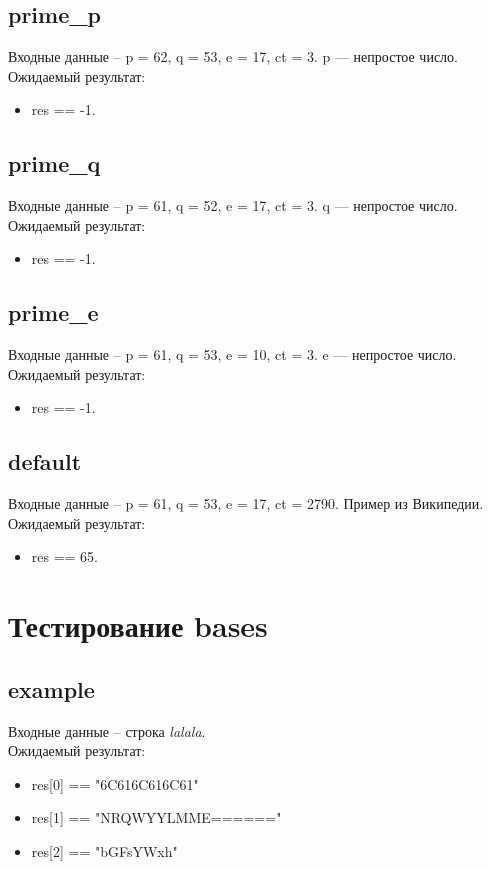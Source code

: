 \documentclass{article}
\begin{document}
\subsection{prime\_p}
Входные данные -- p = 62, q = 53, e = 17, ct = 3. p --- непростое число.\\
Ожидаемый результат: 
\begin{itemize}
    \item res == -1. 
\end{itemize}

\subsection{prime\_q}
Входные данные -- p = 61, q = 52, e = 17, ct = 3. q --- непростое число.\\
Ожидаемый результат: 
\begin{itemize}
    \item res == -1. 
\end{itemize}

\subsection{prime\_e}
Входные данные -- p = 61, q = 53, e = 10, ct = 3. e --- непростое число.\\
Ожидаемый результат: 
\begin{itemize}
    \item res == -1. 
\end{itemize}

\subsection{default}
Входные данные -- p = 61, q = 53, e = 17, ct = 2790. Пример из Википедии.\\
Ожидаемый результат: 
\begin{itemize}
    \item res == 65. 
\end{itemize}

\section{Тестирование bases}
\subsection{example}
Входные данные -- строка \textit{lalala}.\\
Ожидаемый результат: 
\begin{itemize}
    \item res[0] == "6C616C616C61"
    \item res[1] == "NRQWYYLMME======"
    \item res[2] == "bGFsYWxh" 
\end{itemize}
\end{document}
